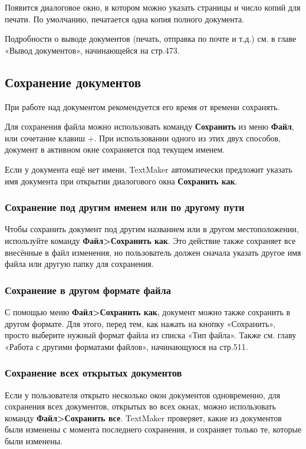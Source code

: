 \documentclass[a4paper,10pt]{article}
\begin{document}
Появится диалоговое окно, в котором можно указать страницы и число копий для печати. По умолчанию, печатается одна копия полного документа.

Подробности о выводе документов (печать, отправка по почте и т.д.) см. в главе «Вывод документов», начинающейся на стр.473.

\subsection{Сохранение документов}
При работе над документом рекомендуется его время от времени сохранять.

Для сохранения файла можно использовать команду \textbf{Сохранить} из меню \textbf{Файл}, или сочетание клавиш +. При использовании одного из этих двух способов, документ в активном окне сохраняется под  текущем именем.

Если у документа ещё нет имени, TextMaker автоматически предложит указать имя документа при открытии диалогового окна \textbf{Сохранить как}.

\subsubsection{Сохранение под другим именем или по другому пути}
Чтобы сохранить документ под другим названием или в другом местоположении, используйте команду \textbf{Файл>Сохранить как}. Это действие также сохраняет все внесённые в файл изменения, но пользователь должен сначала указать другое имя файла или другую папку для сохранения.

\subsubsection{Сохранение в другом формате файла}
С помощью меню \textbf{Файл>Сохранить как}, документ можно также сохранить в другом формате. Для этого, перед тем, как нажать на кнопку «Сохранить», просто выберите нужный формат файла из списка «Тип файла». Также см. главу «Работа с другими форматами файлов», начинающуюся на стр.511.

\subsubsection{Сохранение всех открытых документов}
Если у пользователя открыто несколько окон документов одновременно, для сохранения всех документов, открытых во всех окнах, можно использовать команду \textbf{Файл>Сохранить все}. TextMaker проверяет, какие из документов были изменены с момента последнего сохранения, и сохраняет только те, которые были изменены.
\end{document}

